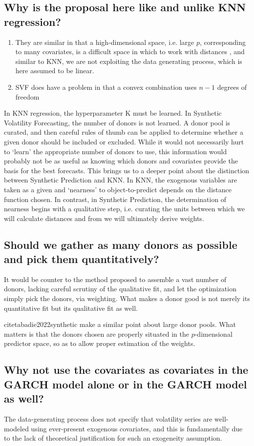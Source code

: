 \documentclass[11pt]{article}
\theoremstyle{definition}
\begin{document}
\subsection{Why is the proposal here like and unlike KNN regression?}
\begin{enumerate}
  \item They are similar in that a high-dimensional space, i.e. large $p$, corresponding to many covariates, is a difficult space in which to work with distances \citep{hastie2009elements}, and similar to KNN, we are not exploiting the data generating process, which is here assumed to be linear.
  \item SVF does have a problem in that a convex combination uses $n-1$ degrees of freedom
\end{enumerate}
In KNN regression, the hyperparameter K must be learned.  In Synthetic Volatility Forecasting, the number of donors is not learned.  A donor pool is curated, and then careful rules of thumb can be applied to determine whether a given donor should be included or excluded.  While it would not necessarily hurt to `learn' the appropriate number of donors to use, this information would probably not be as useful as knowing which donors and covariates provide the basis for the best forecasts.  This brings us to a deeper point about the distinction between Synthetic Prediction and KNN.  In KNN, the exogenous variables are taken as a given and `nearness' to object-to-predict depends on the distance function chosen.  In contrast, in Synthetic Prediction, the determination of nearness begins with a qualitative step, i.e. curating the units between which we will calculate distances and from we will ultimately derive weights.

\subsection{Should we gather as many donors as possible and pick them quantitatively?}
It would be counter to the method proposed to assemble a vast number of donors, lacking careful scrutiny of the qualitative fit, and let the optimization simply pick the donors, via weighting.  What makes a donor good is not merely its quantitative fit but its qualitative fit as well.

citet{abadie2022synthetic} make a similar point about large donor pools.  What matters is that the donors chosen are properly situated in the $p$-dimensional predictor space, so as to allow proper estimation of the weights.
\subsection{Why not use the covariates as covariates in the GARCH model alone or in the GARCH model as well?}
The data-generating process does not specify that volatility series are well-modeled using ever-present exogenous covariates, and this is fundamentally due to the lack of theoretical justification for such an exogeneity assumption.  
\end{document}
